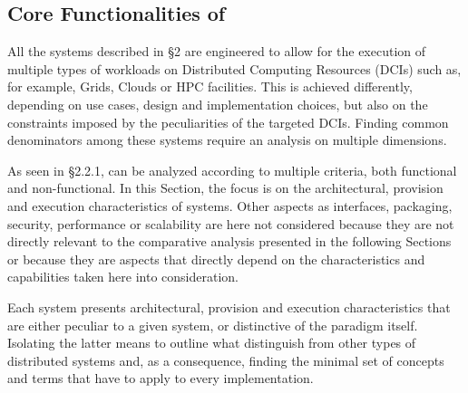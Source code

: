\documentclass{sig-alternate}
\begin{document}

\subsection{Core Functionalities of \pilotjobs}


All the \pilotjob systems described in \S2 are engineered to allow for the execution of multiple types of workloads on Distributed Computing Resources (DCIs) such as, for example, Grids, Clouds or HPC facilities. This is achieved differently, depending on use cases, design and implementation choices, but also on the constraints imposed by the peculiarities of the targeted DCIs. Finding common denominators among these systems require an analysis on multiple dimensions.

As seen in \S2.2.1, \pilotjobs can be analyzed according to multiple criteria,
both functional and non-functional. In this Section, the focus is on the
architectural, provision and execution characteristics of \pilotjob
systems. Other aspects as interfaces, packaging,
security, performance or scalability are here not considered because they are
not directly relevant to the comparative analysis presented in the following
Sections or because they are aspects that directly depend on the
characteristics and capabilities taken here into consideration.

Each \pilotjob system presents architectural, provision and execution
characteristics that are either peculiar to a given system, or distinctive of
the \pilotjob paradigm itself. Isolating the latter means to outline what
distinguish \pilotjobs from other types of distributed systems and, as a
consequence, finding the minimal set of concepts and terms that have to apply
to every \pilotjob implementation.
\end{document}
